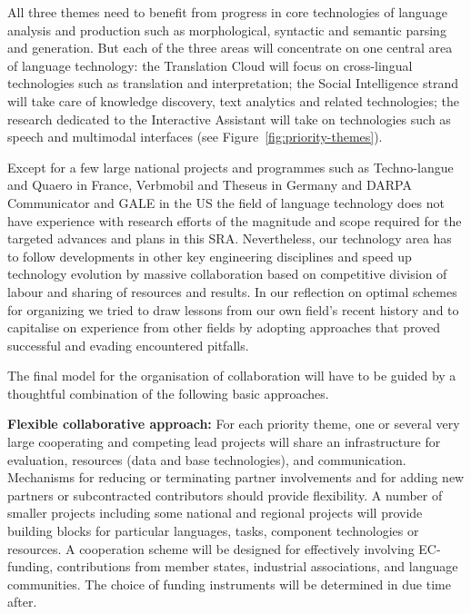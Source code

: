 \documentclass[10pt, plain]{../../metanetpaper}
\begin{document}
\begin{multicols}{2}
All three themes need to benefit from progress in core technologies of language analysis and production such as morphological, syntactic and semantic parsing and generation. But each of the three areas will concentrate on one central area of language technology: the Translation Cloud will focus on cross-lingual technologies such as translation and interpretation; the Social Intelligence strand will take care of knowledge discovery, text analytics and related technologies; the research dedicated to the Interactive Assistant will take on technologies such as speech and multimodal interfaces (see Figure~\ref{fig:priority-themes}).

Except for a few large national projects and programmes such as Techno-langue and Quaero in France, Verbmobil and Theseus in Germany and DARPA Communicator and GALE in the US the field of language technology does not have experience with research efforts of the magnitude and scope required for the targeted advances and plans in this SRA. Nevertheless, our technology area has to follow developments in other key engineering disciplines and speed up technology evolution by massive collaboration based on competitive division of labour and sharing of resources and results. In our reflection on optimal schemes for organizing we tried to draw lessons from our own field's recent history and to capitalise on experience from other fields by adopting approaches that proved successful and evading encountered pitfalls.
 
The final model for the organisation of collaboration will have to be guided by a thoughtful combination of the following basic approaches.


\textbf{Flexible collaborative approach:} For each priority theme, one or several very large cooperating and competing lead projects will share an infrastructure for evaluation, resources (data and base technologies), and communication. Mechanisms for reducing or terminating partner involvements and for adding new partners or subcontracted contributors should provide flexibility. A number of smaller projects including some national and regional projects will provide building blocks for particular languages, tasks, component technologies or resources. A cooperation scheme will be designed for effectively involving EC-funding, contributions from member states, industrial associations, and language communities. The choice of funding instruments will be determined in due time after.


\end{multicols}
\end{document}
